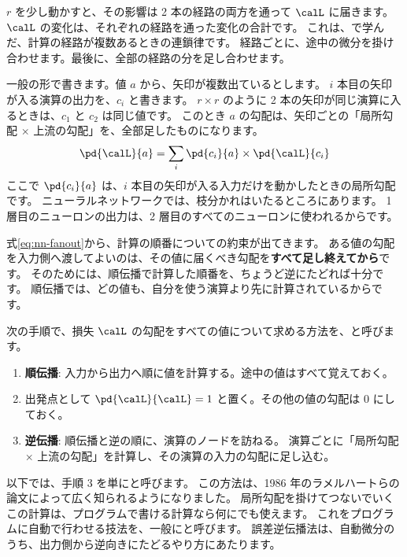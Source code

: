 $r$ を少し動かすと、その影響は 2 本の経路の両方を通って $\calL$ に届きます。
$\calL$ の変化は、それぞれの経路を通った変化の合計です。
これは、で学んだ、計算の経路が複数あるときの連鎖律です。
経路ごとに、途中の微分を掛け合わせます。最後に、全部の経路の分を足し合わせます。

一般の形で書きます。値 $a$ から、矢印が複数出ているとします。
$i$ 本目の矢印が入る演算の出力を、$c_i$ と書きます。
$r\times r$ のように 2 本の矢印が同じ演算に入るときは、$c_1$ と $c_2$ は同じ値です。
このとき $a$ の勾配は、矢印ごとの「局所勾配 $\times$ 上流の勾配」を、全部足したものになります。
\begin{equation}
\pd{\calL}{a}=\sum_{i}\pd{c_i}{a}\times\pd{\calL}{c_i}
\label{eq:nn-fanout}
\end{equation}
ここで $\pd{c_i}{a}$ は、$i$ 本目の矢印が入る入力だけを動かしたときの局所勾配です。
ニューラルネットワークでは、枝分かれはいたるところにあります。
1 層目のニューロンの出力は、2 層目のすべてのニューロンに使われるからです。

式\eqref{eq:nn-fanout}から、計算の順番についての約束が出てきます。
ある値の勾配を入力側へ渡してよいのは、その値に届くべき勾配を\textbf{すべて足し終えてから}です。
そのためには、順伝播で計算した順番を、ちょうど逆にたどれば十分です。
順伝播では、どの値も、自分を使う演算より先に計算されているからです。

\begin{definition}[誤差逆伝播法]\label{def:nn-backprop}
次の手順で、損失 $\calL$ の勾配をすべての値について求める方法を、と呼びます。
\begin{enumerate}
\item \textbf{順伝播}: 入力から出力へ順に値を計算する。途中の値はすべて覚えておく。
\item 出発点として $\pd{\calL}{\calL}=1$ と置く。その他の値の勾配は 0 にしておく。
\item \textbf{逆伝播}: 順伝播と逆の順に、演算のノードを訪ねる。
演算ごとに「局所勾配 $\times$ 上流の勾配」を計算し、その演算の入力の勾配に足し込む。
\end{enumerate}
\end{definition}

以下では、手順 3 を単にと呼びます。
この方法は、1986 年のラメルハートらの論文\cite{rumelhart1986learning}によって広く知られるようになりました。
局所勾配を掛けてつないでいくこの計算は、プログラムで書ける計算なら何にでも使えます。
これをプログラムに自動で行わせる技法を、一般にと呼びます\cite{baydin2018automatic}。
誤差逆伝播法は、自動微分のうち、出力側から逆向きにたどるやり方にあたります。

